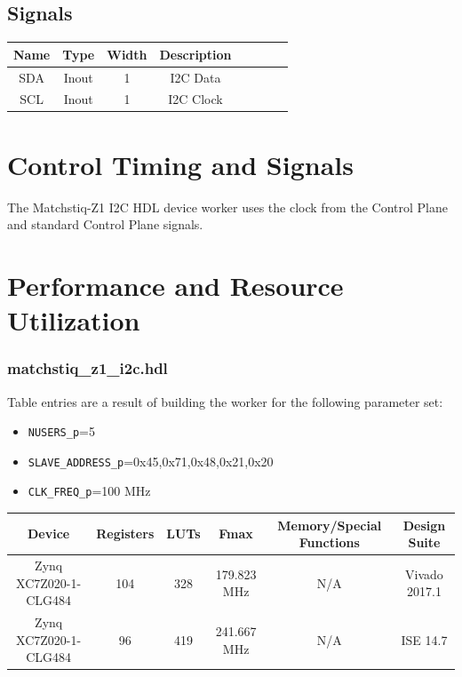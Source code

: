 \documentclass{article}
\def\comp{matchstiq\_z1\_i2c}
\begin{document}
\begin{landscape}
	\section*{Signals}
	\begin{scriptsize}
	\begin{tabular}{|c|c|c|c|p{2.6cm}|c|c|c|}
		\hline
		\rowcolor{blue}
		Name & Type  & Width & Description \\
		\hline
		SDA  & Inout & 1     & I2C Data    \\
		\hline
		SCL  & Inout & 1     & I2C Clock   \\
		\hline
	\end{tabular}
	\end{scriptsize}
\end{landscape}

\section*{Control Timing and Signals}
The Matchstiq-Z1 I2C HDL device worker uses the clock from the Control Plane and standard Control Plane signals.

\section*{Performance and Resource Utilization}
\subsubsection*{\comp.hdl}
Table entries are a result of building the worker for the following parameter set:\
\begin{itemize}
	\item \verb+NUSERS_p+=5
	\item \verb+SLAVE_ADDRESS_p+={0x45,0x71,0x48,0x21,0x20}
	\item \verb+CLK_FREQ_p+=100 MHz
\end{itemize}
\begin{scriptsize}
	\begin{tabular}{|c|c|c|c|c|c|}
		\hline
		\rowcolor{blue}
		Device             & Registers & LUTs & Fmax        & Memory/Special Functions & Design Suite \\
		\hline
		Zynq XC7Z020-1-CLG484 & 104       & 328  & 179.823 MHz & N/A                         & Vivado 2017.1     \\
		\hline
		Zynq XC7Z020-1-CLG484 & 96        & 419  & 241.667 MHz & N/A                          & ISE 14.7     \\
		\hline
	\end{tabular}
\end{scriptsize}
\end{document}
